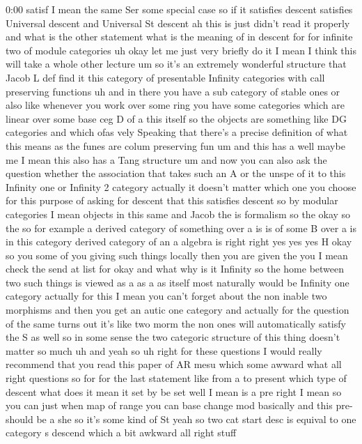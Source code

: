 \begin{unfinished}{0:00}
satisf  I  mean  the  same
Ser  some  special  case  so  if  it  satisfies
descent  satisfies  Universal  descent  and
Universal  St  descent  ah  this  is  just
didn't  read  it  properly  and  what  is  the
other  statement  what  is  the  meaning  of
in  descent  for  for  infinite  two  of
module
categories
uh  okay  let  me  just  very  briefly  do  it  I
mean  I  think  this  will  take  a  whole
other  lecture
um  so  it's  an  extremely  wonderful
structure  that  Jacob  L  def  find  it  this
category  of  presentable  Infinity
categories  with  call  preserving
functions  uh  and  in  there  you  have  a  sub
category  of  stable  ones  or  also  like
whenever  you  work  over  some  ring  you
have  some  categories  which  are  linear
over  some  base  ceg  D  of
a  this  itself  so  the  objects  are
something  like  DG  categories  and  which
ofas  vely  Speaking  that  there's  a
precise  definition  of  what  this  means  as
the  funes  are  colum  preserving  fun  um
and  this  has  a  well  maybe  me  I  mean  this
also  has  a  Tang
structure  um  and  now  you  can  also  ask
the  question  whether  the  association
that  takes  such  an  A  or  the  unspe  of
it  to  this  Infinity  one  or  Infinity  2
category  actually  it  doesn't  matter
which  one  you  choose  for  this  purpose  of
asking  for  descent  that  this  satisfies
descent  so  by  modular  categories  I  mean
objects  in  this  same
and  Jacob  the  is
formalism  so  the  okay  so  the  so  for
example  a  derived  category  of  something
over  a  is  is  of  some  B  over  a  is  in  this
category  derived  category  of  an  a
algebra  is  right  right  yes  yes
yes  H  okay  so  you  some  of  you  giving
such  things  locally  then  you  are  given
the  you  I  mean  check  the  send  at  list
for  okay  and  what  why  is  it  Infinity  so
the  home  between  two  such  things  is
viewed  as  a  as  a  as
itself  most  naturally  would  be  Infinity
one  category  actually  for
this  I  mean  you  can't  forget  about  the
non  inable  two  morphisms  and  then  you
get  an  autic  one  category  and  actually
for  the  question  of  the  same  turns  out
it's  like  two  morm  the  non  ones  will
automatically  satisfy  the  S  as  well  so
in  some
sense  the  two  categoric  structure  of
this  thing  doesn't  matter  so
much  uh  and  yeah  so
uh  right  for  these  questions  I  would
really  recommend  that  you  read  this
paper  of  AR
mesu  which  some  awward
what
all  right
questions  so  for  for  the  last
statement  like  from  a  to
present  which  type  of  descent  what  does
it  mean  it  set  by  be  set  well  I  mean  is
a  pre  right  I  mean  so  you  can  just  when
map  of  range  you  can  base  change
mod  basically  and  this  pre-  should  be  a
she  so  it's  some  kind  of
St  yeah  so  two  cat  start  desc  is  equival
to  one  category  s  descend  which  a  bit
awkward
all
right
stuff
\end{unfinished}